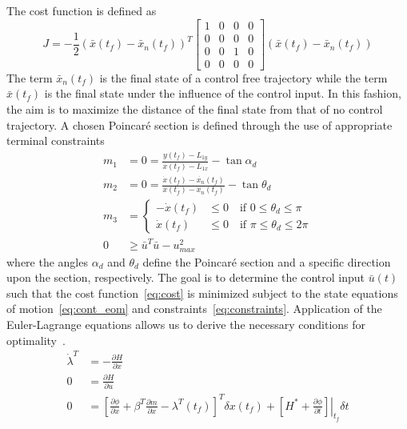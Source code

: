 The cost function is defined as
\begin{equation}
	J = -\frac{1}{2} \left( \bar{x}(t_f) - \bar{x}_{n}(t_f)\right)^T 
	\left[
	\begin{array}{cccc}
		1 & 0& 0& 0 \\
		 0& 0& 0& 0\\
		 0 & 0 & 1 &0\\
		 0 & 0& 0& 0
	\end{array}
	\right]
	\left( \bar{x}(t_f) - \bar{x}_{n}(t_f)\right)
	\label{eq:cost}
\end{equation}
The term \( \bar{x}_n(t_f) \) is the final state of a control free trajectory while the term \( \bar{x}(t_f) \) is the final state under the influence of the control input.
In this fashion, the aim is to maximize the distance of the final state from that of no control trajectory. 
A chosen Poincar\'e section is defined through the use of appropriate terminal constraints
\begin{subequations}
\begin{align}
     m_1 &= 0 = \frac{y(t_f) - L_{1y}}{x(t_f) - L_{1x}} - \tan{\alpha_d} \\ 
    m_2&= 0 = \frac{\dot{x}(t_f) - \dot{x_n}(t_f) }{x(t_f) -x_n(t_f) } - \tan{\theta_d} \\
    m_3 &= \begin{cases}
    	-\dot{x}(t_f) &\leq 0 \quad \text{if } 0 \leq \theta_d \leq \pi \\
		\dot{x}(t_f) &\leq 0 \quad \text{if } \pi \leq \theta_d \leq 2 \pi
    \end{cases}  \\
	 0 &\geq\bar{u}^T \bar{u} - u_{max}^2 
\end{align}
    \label{eq:constraints}
\end{subequations}
where the angles \( \alpha_d\) and \( \theta_d\) define the Poincar\'e section and a specific direction upon the section, respectively. 
The goal is to determine the control input \( \bar{u}(t)\) such that the cost function~\eqref{eq:cost} is minimized subject to the state equations of motion~\eqref{eq:cont_eom} and constraints~\eqref{eq:constraints}.
Application of the Euler-Lagrange equations allows us to derive the necessary conditions for optimality~\cite{bryson1975}.
\begin{subequations}\label{eq:necc_cond}
\begin{align}
	\dot{\lambda}^T &= - \frac{\partial H}{\partial x} \\
	0 &=  \frac{\partial H}{\partial u} \\
	0 &= \left[\frac{\partial \phi}{\partial x} + \beta^T \frac{\partial m}{\partial x} - \lambda^T(t_f) \right]^T \delta x(t_f) + \left. \left[ H^* + \frac{\partial \phi}{\partial t} \right] \right|_{t_f} \delta t
\end{align}
\end{subequations}
